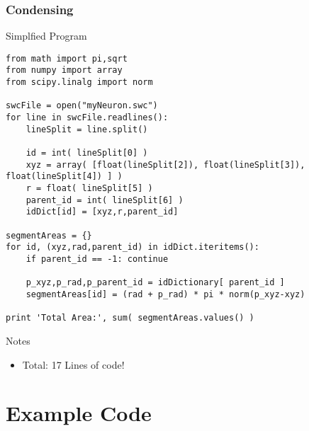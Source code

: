 \documentclass{beamer}
\begin{document}
\begin{frame}[fragile]
	\frametitle{Condensing}
	\tiny

\begin{block}{Simplfied Program}
\begin{verbatim}
from math import pi,sqrt
from numpy import array
from scipy.linalg import norm

swcFile = open("myNeuron.swc")
for line in swcFile.readlines():
    lineSplit = line.split()
    
    id = int( lineSplit[0] )
    xyz = array( [float(lineSplit[2]), float(lineSplit[3]), float(lineSplit[4]) ] )
    r = float( lineSplit[5] ) 
    parent_id = int( lineSplit[6] ) 
    idDict[id] = [xyz,r,parent_id]

segmentAreas = {}
for id, (xyz,rad,parent_id) in idDict.iteritems():
    if parent_id == -1: continue
        
    p_xyz,p_rad,p_parent_id = idDictionary[ parent_id ]
    segmentAreas[id] = (rad + p_rad) * pi * norm(p_xyz-xyz)

print 'Total Area:', sum( segmentAreas.values() ) \end{verbatim}
\end{block}

\begin{block}{Notes}
\begin{itemize}
	\item Total: 17 Lines of code!
\end{itemize}

\end{block}
\end{frame}



































\section{Example Code}
\end{document}
